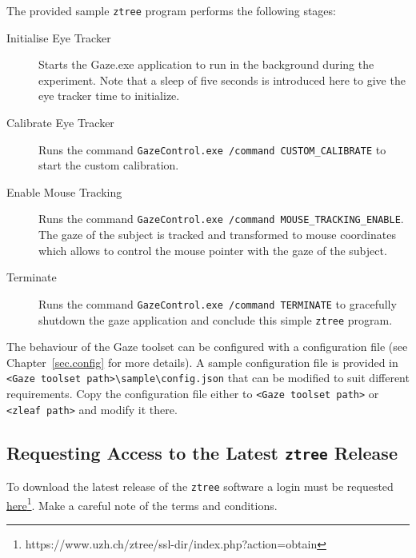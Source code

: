 \documentclass[a4paper,oneside]{book}
\begin{document}
The provided sample \texttt{ztree} program performs the following stages:
\begin{description}
    \item[Initialise Eye Tracker]
        Starts the Gaze.exe application to run in the background during the experiment.
        Note that a sleep of five seconds is introduced here to give the eye tracker time to initialize.
    \item[Calibrate Eye Tracker]
        Runs the command \texttt{GazeControl.exe /command CUSTOM\_CALIBRATE} to start the custom calibration.
    \item[Enable Mouse Tracking]
        Runs the command \texttt{GazeControl.exe /command MOUSE\_TRACKING\_ENABLE}.
        The gaze of the subject is tracked and transformed to mouse coordinates which allows to control the mouse pointer with the gaze of the subject.
    \item[Terminate]
        Runs the command \texttt{GazeControl.exe /command TERMINATE} to gracefully shutdown the gaze application and conclude this simple \texttt{ztree} program.
\end{description}

The behaviour of the Gaze toolset can be configured with a configuration file (see Chapter~\ref{sec.config} for more details).
A sample configuration file is provided in \texttt{<Gaze toolset path>\textbackslash sample\textbackslash config.json} that can be modified to suit different requirements.
Copy the configuration file either to \texttt{<Gaze toolset path>} or \texttt{<zleaf path>} and modify it there.

\subsection{Requesting Access to the Latest \texttt{ztree} Release}
\label{sec.ztree}
To download the latest release of the \texttt{ztree} software a login must be requested \href{https://www.uzh.ch/ztree/ssl-dir/index.php?action=obtain}{here}\footnote{https://www.uzh.ch/ztree/ssl-dir/index.php?action=obtain}.
Make a careful note of the terms and conditions.

\end{document}
